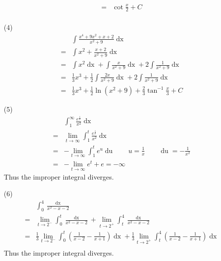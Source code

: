 \begin{itemize}
{\begin{align*}
		=& \cot\frac{x}{2} + C\\
		\end{align*}
	}
	\item [(4)]{
		\begin{align*}
		& \int \frac{x^4+9x^2+x+2}{x^2+9}\mathop{dx}\\
		=& \int x^2+\frac{x+2}{x^2+9}\mathop{dx}\\
		=& \int x^2\mathop{dx} + \int \frac{x}{x^2+9}\mathop{dx} + 2\int \frac{1}{x^2+9}\mathop{dx}\\
		=& \frac{1}{3} x^3 + \frac{1}{2} \int \frac{2x}{x^2+9}\mathop{dx} + 2\int \frac{1}{x^2+9}\mathop{dx}\\
		=& \frac{1}{3} x^3 + \frac{1}{2} \ln\left(x^2+9\right) + \frac{2}{3}\tan^{-1}\frac{x}{3} + C
		\end{align*}
	}
	\item [(5)]{
		\begin{align*}
		& \int_1^{\infty} \frac{e^\frac{1}{x}}{x^2}\mathop{dx}\\
		=& \lim_{t\rightarrow\infty} \int_1^t \frac{e^\frac{1}{x}}{x^2}\mathop{dx}\\
		=& - \lim_{t\rightarrow\infty} \int_1^t e^u\mathop{du}\qquad u=\frac{1}{x}\qquad \mathop{du}=-\frac{1}{x^2}\\
		=& - \lim_{t\rightarrow\infty} e^t + e = -\infty
		\end{align*}
		Thus the improper integral diverges.
	}
	\item [(6)]{
		\begin{align*}
		& \int_0^4 \frac{\mathop{dx}}{x^2-x-2}\\
		=& \lim_{t\rightarrow 2^-}\int_0^t \frac{\mathop{dx}}{x^2-x-2} + \lim_{t\rightarrow 2^+}\int_t^4 \frac{\mathop{dx}}{x^2-x-2}\\
		=& \frac{1}{3}\lim_{t\rightarrow 2^-}\int_0^t \left(\frac{1}{x-2}-\frac{1}{x+1}\right)\mathop{dx} + \frac{1}{3}\lim_{t\rightarrow 2^+}\int_t^4 \left(\frac{1}{x-2}-\frac{1}{x+1}\right)\mathop{dx}\\
		\end{align*}
		Thus the improper integral diverges.
	}
\end{itemize}


